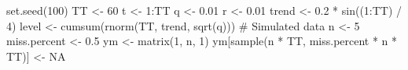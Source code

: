 \begin{Schunk}
\begin{Sinput}
 set.seed(100)
 TT <- 60
 t <- 1:TT
 q <- 0.01
 r <- 0.01
 trend <- 0.2 * sin((1:TT) / 4)
 level <- cumsum(rnorm(TT, trend, sqrt(q)))
 # Simulated data
 n <- 5
 miss.percent <- 0.5
 ym <- matrix(1, n, 1) %*% level + matrix(rnorm(TT * n, 0, sqrt(r * 100)), n, TT)
 ym[sample(n * TT, miss.percent * n * TT)] <- NA
\end{Sinput}
\end{Schunk}
